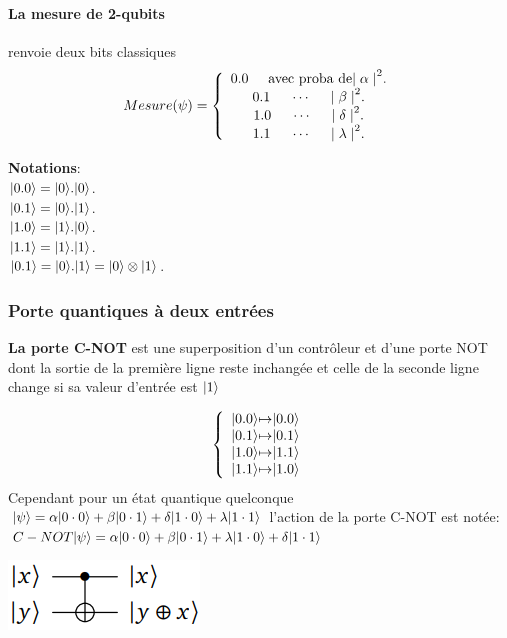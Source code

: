 \documentclass[12pt,openany]{report}
\DeclarePairedDelimiter\ket{\lvert}{\rangle}
\begin{document}
\paragraph{La mesure de 2-qubits} renvoie deux bits classiques
\[  Mesure(\psi)=
\left \{
\begin{array}{c c}
0.0 \hspace{0.5cm} \text{avec proba de} {\mid \alpha \mid}^2. \\
0.1 \hspace{0.5cm} \cdots  \hspace{0.5cm}  {\mid \beta \mid}^2 .              \\
1.0 \hspace{0.5cm} \cdots \hspace{0.5cm}  {\mid \delta \mid}^2 .               \\
1.1 \hspace{0.5cm} \cdots  \hspace{0.5cm}   {\mid \lambda \mid}^2     .          \\
  
\end{array}
\right.
\]

\textbf{Notations}: \\
$ \ket{0.0}=\ket{0}.\ket{0}  $.\\
$ \ket{0.1}= \ket{0}.\ket{1}  $.\\
$ \ket{1.0}= \ket{1}.\ket{0}  $.\\
$ \ket{1.1}= \ket{1}.\ket{1}  $.\\
$ \ket{0.1}= \ket{0}.\ket{1} = \ket{0} \otimes \ket{1} $.\\
\subsubsection{ Porte quantiques à deux entrées  }

\textbf{La porte C-NOT}  est une superposition d'un contrôleur et d'une porte NOT dont la sortie de la première ligne reste inchangée et celle de la seconde ligne change si sa valeur d'entrée est $\ket{1} $

\[  
\left \{
\begin{array}{c @{\mapsto} c}
\ket{0.0} &  \ket{0.0}\\
 \ket{0.1} & \ket{0.1}\\
 \ket{1.0} & \ket{1.1}\\
 \ket{1.1}&  \ket{1.0}
  
\end{array}
\right.
\]
Cependant pour un état quantique quelconque $\ket{\psi}=\alpha \ket{0\cdot 0} + \beta \ket{0\cdot 1} + \delta \ket{1 \cdot 0} + \lambda \ket{1\cdot 1}   $ l'action de la porte C-NOT est notée: 
$  C-NOT\ket{\psi}=\alpha \ket{0\cdot 0} + \beta \ket{0\cdot 1} + \lambda \ket{1 \cdot 0} + \delta \ket{1\cdot 1}  $
\begin{center}
\includegraphics[scale=1]{./cnot}
\end{center}
\end{document}
